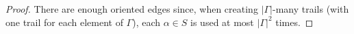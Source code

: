 \documentclass[11pt]{article}
\theoremstyle{definition}
\begin{document}
\begin{proof}
    There are enough oriented edges since, when creating $|\Gamma|$-many trails (with one trail for each element of $\Gamma$),  each $\alpha \in S$ is used at most $|\Gamma|^2$ times. 
\end{proof}
\end{document}
